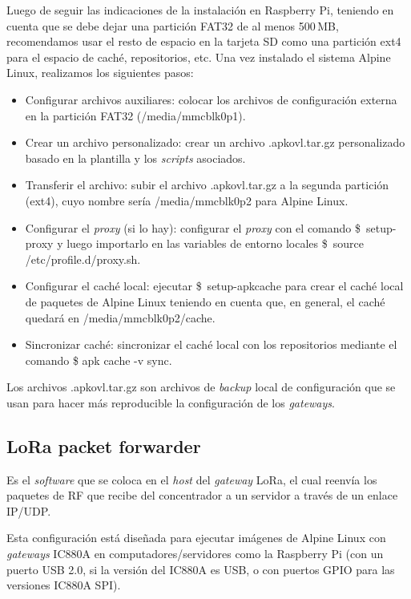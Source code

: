Luego de seguir las indicaciones de la instalación en Raspberry Pi, teniendo en cuenta que se debe dejar una partición FAT32 de al menos 500\,MB, recomendamos usar el resto de espacio en la tarjeta SD como una partición ext4 para el espacio de caché, repositorios, etc.
Una vez instalado el sistema Alpine Linux, realizamos los siguientes pasos:

\begin{itemize}
  \item Configurar archivos auxiliares: colocar los archivos de configuración externa en la partición FAT32 ({/media/mmcblk0p1}).
  \item Crear un archivo personalizado: crear un archivo {.apkovl.tar.gz} personalizado basado en la plantilla y los \emph{scripts} asociados.
  \item Transferir el archivo: subir el archivo {.apkovl.tar.gz} a la segunda partición (ext4), cuyo nombre sería {/media/mmcblk0p2} para Alpine Linux.
  \item Configurar el \emph{proxy} (si lo hay): configurar el \emph{proxy} con el comando {\$~setup-proxy} y luego importarlo en las variables de entorno locales {\$~source /etc/profile.d/proxy.sh}.
  \item Configurar el caché local: ejecutar {\$~setup-apkcache} para crear el caché local de paquetes de Alpine Linux teniendo en cuenta que, en general, el caché quedará en {/media/mmcblk0p2/cache}.
  \item Sincronizar caché: sincronizar el caché local con los repositorios mediante el comando {\$ apk cache -v sync}.
\end{itemize}

Los archivos {.apkovl.tar.gz} son archivos de \emph{backup} local de configuración que se usan para hacer más reproducible la configuración de los \emph{gateways}.

\subsection{LoRa packet forwarder}

Es el \emph{software} que se coloca en el \emph{host} del \emph{gateway} LoRa, el cual reenvía los paquetes de RF que recibe del concentrador a un servidor a través de un enlace IP/UDP.

Esta configuración está diseñada para ejecutar imágenes de Alpine Linux con \emph{gateways} IC880A en computadores/servidores como la Raspberry Pi (con un puerto USB 2.0, si la versión del IC880A es USB, o con puertos GPIO para las versiones IC880A SPI).

